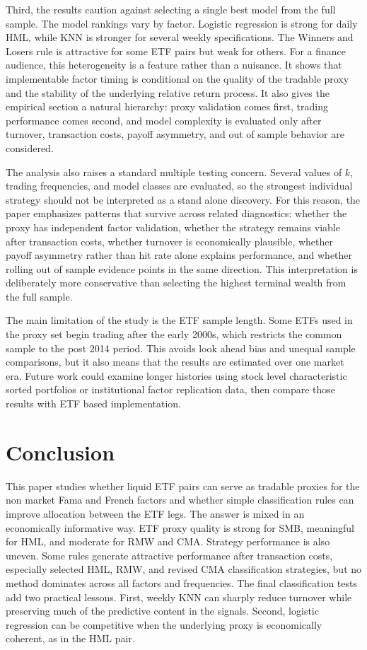 \documentclass[investment,article,submit,pdftex,moreauthors]{Definitions/mdpi}
\begin{document}
Third, the results caution against selecting a single best model from the full sample. The model rankings vary by factor. Logistic regression is strong for daily HML, while KNN is stronger for several weekly specifications. The Winners and Losers rule is attractive for some ETF pairs but weak for others. For a finance audience, this heterogeneity is a feature rather than a nuisance. It shows that implementable factor timing is conditional on the quality of the tradable proxy and the stability of the underlying relative return process. It also gives the empirical section a natural hierarchy: proxy validation comes first, trading performance comes second, and model complexity is evaluated only after turnover, transaction costs, payoff asymmetry, and out of sample behavior are considered.

The analysis also raises a standard multiple testing concern. Several values of \(k\), trading frequencies, and model classes are evaluated, so the strongest individual strategy should not be interpreted as a stand alone discovery. For this reason, the paper emphasizes patterns that survive across related diagnostics: whether the proxy has independent factor validation, whether the strategy remains viable after transaction costs, whether turnover is economically plausible, whether payoff asymmetry rather than hit rate alone explains performance, and whether rolling out of sample evidence points in the same direction. This interpretation is deliberately more conservative than selecting the highest terminal wealth from the full sample.

The main limitation of the study is the ETF sample length. Some ETFs used in the proxy set begin trading after the early 2000s, which restricts the common sample to the post 2014 period. This avoids look ahead bias and unequal sample comparisons, but it also means that the results are estimated over one market era. Future work could examine longer histories using stock level characteristic sorted portfolios or institutional factor replication data, then compare those results with ETF based implementation.

\section{Conclusion}

This paper studies whether liquid ETF pairs can serve as tradable proxies for the non market Fama and French factors and whether simple classification rules can improve allocation between the ETF legs. The answer is mixed in an economically informative way. ETF proxy quality is strong for SMB, meaningful for HML, and moderate for RMW and CMA. Strategy performance is also uneven. Some rules generate attractive performance after transaction costs, especially selected HML, RMW, and revised CMA classification strategies, but no method dominates across all factors and frequencies. The final classification tests add two practical lessons. First, weekly KNN can sharply reduce turnover while preserving much of the predictive content in the signals. Second, logistic regression can be competitive when the underlying proxy is economically coherent, as in the HML pair.
\end{document}
